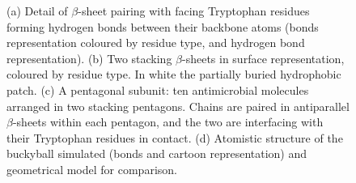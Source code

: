 \begin{figure}[t]
\centering
{}
\hspace{0.05\linewidth}
\caption[Building blocks of capzip assembly]{(a) Detail of $\beta$-sheet pairing with facing Tryptophan residues forming hydrogen bonds between their backbone atoms (bonds representation coloured by residue type, and hydrogen bond representation). (b) Two stacking $\beta$-sheets in surface representation, coloured by residue type. In white the partially buried hydrophobic patch. (c) A pentagonal subunit: ten antimicrobial molecules arranged in two stacking pentagons. Chains are paired in antiparallel $\beta$-sheets within each pentagon, and the two are interfacing with their Tryptophan residues in contact. (d) Atomistic structure of the buckyball simulated (bonds and cartoon representation) and geometrical model for comparison.}
\label{fig:BTI_vmd}
\end{figure}
